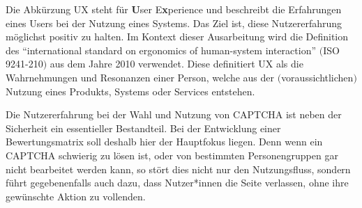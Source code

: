 Die Abkürzung UX steht für \textbf{U}ser E\textbf{x}perience und beschreibt die Erfahrungen eines Users bei der Nutzung eines Systems. 
Das Ziel ist, diese Nutzererfahrung möglichst positiv zu halten. 
Im Kontext dieser Ausarbeitung wird die Definition des  ``international standard on ergonomics of human-system interaction'' $($ISO 9241-210$)$
aus dem Jahre 2010 verwendet. 
Diese definitiert UX als die Wahrnehmungen und Resonanzen einer Person, 
welche aus der $($voraussichtlichen$)$ Nutzung eines Produkts, Systems oder Services entstehen. \cite[p.1629]{berni_borgianni_2021}

Die Nutzererfahrung bei der Wahl und Nutzung von CAPTCHA ist neben der Sicherheit ein essentieller Bestandteil.
Bei der Entwicklung einer Bewertungsmatrix soll deshalb hier der Hauptfokus liegen.
Denn wenn ein CAPTCHA schwierig zu lösen ist, oder von bestimmten Personengruppen gar nicht bearbeitet werden kann, so stört dies nicht nur den Nutzungsfluss,
sondern führt gegebenenfalls auch dazu, dass Nutzer*innen die Seite verlassen, ohne ihre gewünschte Aktion zu vollenden. 

